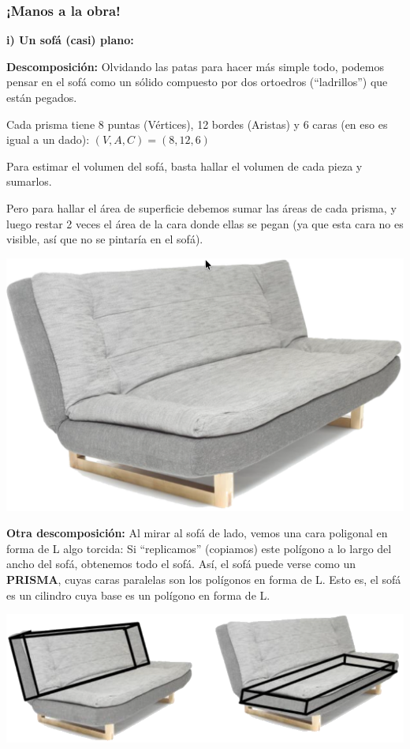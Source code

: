 \documentclass[12pt,a4paper]{article}
\begin{document}
\begin{multicols}{2}
	
	\subsubsection*{¡Manos a la obra!}

\textbf{i) Un sofá (casi) plano:}

\textbf{Descomposición:} Olvidando las patas para hacer más simple todo, podemos pensar en el sofá como un sólido compuesto por dos ortoedros (``ladrillos'') que están pegados.

Cada prisma tiene 8 puntas (Vértices), 12 bordes (Aristas) y 6 caras (en eso es igual a un dado): $(V, A, C) = (8, 12, 6)$

Para estimar el volumen del sofá, basta hallar el volumen de cada pieza y sumarlos.

Pero para hallar el área de superficie debemos sumar las áreas de cada prisma, y luego restar 2 veces el área de la cara donde ellas se pegan (ya que esta cara no es visible, así que no se pintaría en el sofá).

\begin{center}
\includegraphics[width=0.8\columnwidth]{Figuras/fig18.png}
\end{center}

\textbf{Otra descomposición:} Al mirar al sofá de lado, vemos una cara poligonal en forma de L algo torcida:
Si ``replicamos'' (copiamos) este polígono a lo largo del ancho del sofá, obtenemos todo el sofá. Así, el sofá puede verse como un \textbf{PRISMA}, cuyas caras paralelas son los polígonos en forma de L.
Esto es, el sofá es un cilindro cuya base es un polígono en forma de L.

\begin{center}
\includegraphics[width=0.9\columnwidth]{Figuras/fig19.png}
\end{center}


\end{multicols}
\end{document}
